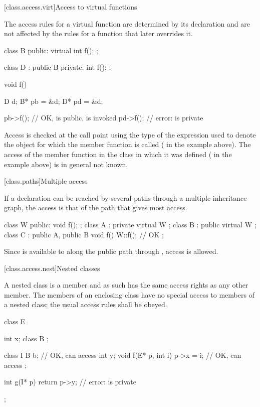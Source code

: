 [class.access.virt]{Access to virtual functions}%

\pnum
The access rules for a virtual function are determined by its declaration
and are not affected by the rules for a function that later overrides it.
\begin{example}
\begin{codeblock}
class B {
public:
  virtual int f();
};

class D : public B {
private:
  int f();
};

void f() {
  D d;
  B* pb = &d;
  D* pd = &d;

  pb->f();                      // OK,  is public,  is invoked
  pd->f();                      // error:  is private
}
\end{codeblock}
\end{example}

\pnum
Access is checked at the call point using the type of the expression used
to denote the object for which the member function is called
(
in the example above).
The access of the member function in the class in which it was defined
(
in the example above) is in general not known.

[class.paths]{Multiple access}%

\pnum
If a declaration can be reached by several paths through a multiple inheritance
graph, the access is that of the path that gives most access.
\begin{example}
\begin{codeblock}
class W { public: void f(); };
class A : private virtual W { };
class B : public virtual W { };
class C : public A, public B {
  void f() { W::f(); }          // OK
};
\end{codeblock}

Since
is available to
along the public path through
,
access is allowed.
\end{example}

[class.access.nest]{Nested classes}%
%

\pnum
A nested class is a member and as such has the same access rights as any other member.
The members of an enclosing class have no special access to members of a nested
class; the usual access rules shall be obeyed.
\begin{example}
\begin{codeblock}
class E {
  int x;
  class B { };

  class I {
    B b;                        // OK,  can access 
    int y;
    void f(E* p, int i) {
      p->x = i;                 // OK,  can access 
    }
  };

  int g(I* p) {
    return p->y;                // error:  is private
  }
};
\end{codeblock}
\end{example}

